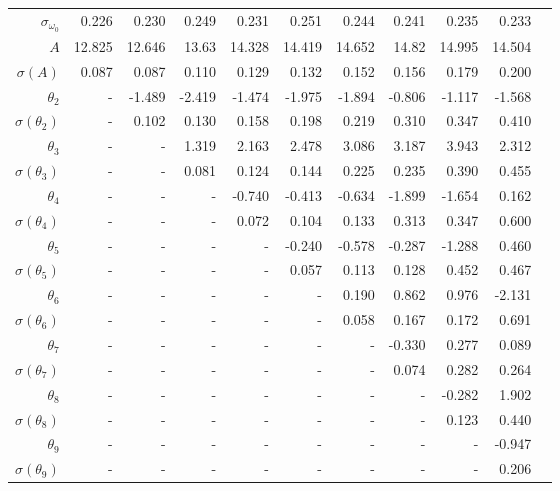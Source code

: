 \documentclass{matmex-diploma-custom}
\begin{document}
\begin{table}[h!!]
\begin{tabular}{r|rrrrrrrrrr}
 $\sigma_{\omega_0} $& 0.226       &     0.230 &   0.249 &   0.231 &   0.251 &   0.244 &    0.241 &   0.235 &   0.233 \\
 $A $&12.825      &   12.646 &   13.63 &  14.328 &  14.419 &  14.652 &    14.82 &  14.995 &  14.504 \\
 $\sigma(A) $ & 0.087       &    0.087 &    0.110 &   0.129 &   0.132 &   0.152 &    0.156 &   0.179 &     0.200 \\
 $\theta_2$&-        &  -1.489 &  -2.419 &  -1.474 &  -1.975 &  -1.894 &   -0.806 &  -1.117 &  -1.568 \\
 $\sigma(\theta_2)$&-      &     0.102 &    0.130 &   0.158 &   0.198 &   0.219 &     0.310 &   0.347 &    0.410 \\
 $\theta_3$&-      &    - &   1.319 &   2.163 &   2.478 &   3.086 &    3.187 &   3.943 &   2.312 \\
 $\sigma(\theta_3)$&-      &    - &   0.081 &   0.124 &   0.144 &   0.225 &    0.235 &   0.390 &   0.455 \\
 $\theta_4$&-      &    - &    - &  -0.740 &  -0.413 &  -0.634 &   -1.899 &  -1.654 &   0.162 \\
 $\sigma(\theta_4)$&-      &    - &    - &     0.072 &   0.104 &   0.133 &    0.313 &   0.347 &   0.600 \\
 $\theta_5$&-      &    - &    - &    - &  -0.240 &  -0.578 &   -0.287 &  -1.288 &   0.460 \\
 $\sigma(\theta_5)$&-      &    - &    - &    - &     0.057 &   0.113 &    0.128 &   0.452 &   0.467 \\
 $\theta_6$&-      &    - &    - &    - &    - &   0.190 &    0.862 &   0.976 &  -2.131 \\
 $\sigma(\theta_6)$&-    &    - &    - &    - &    - &   0.058 &    0.167 &   0.172 &   0.691 \\
 $\theta_7$&-     &    - &    - &    - &    - &    - &  -0.330 &   0.277 &   0.089 \\
 $ \sigma(\theta_7)$&-     &    - &    - &    - &    - &    - &      0.074 &   0.282 &   0.264 \\
 $\theta_8$&-     &    - &    - &    - &    - &    - &    - &   -0.282 &   1.902 \\
 $ \sigma(\theta_8)$&-     &    - &    - &    - &    - &    - &    - &     0.123 &   0.440 \\
 $\theta_9$&-     &    - &    - &    - &    - &    - &    - &    - &  -0.947  \\
 $ \sigma(\theta_9)$&-     &    - &    - &    - &    - &    - &    - &    - &   0.206  \\
\end{tabular}
\end{table}
\pagebreak
\end{document}
